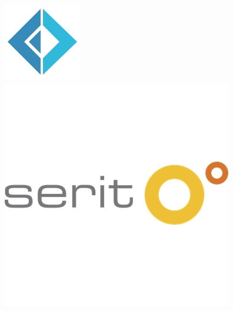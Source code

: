 \documentclass[12pt, a4paper]{article}
\begin{document}
\begin{titlepage}
\begin{figure}[!h]
  \centering
  \begin{minipage}[b]{0.3\textwidth}
    \includegraphics[width=\textwidth]{fsharp128}
  \end{minipage}
  \hfill
  \begin{minipage}[b]{0.3\textwidth}
    \includegraphics[width=\textwidth]{serit_logo}

\end{minipage}
\end{figure}
\end{titlepage}
\end{document}
